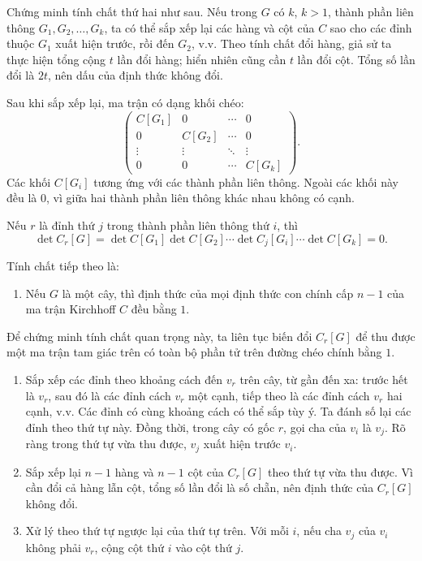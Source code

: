 \documentclass[11pt]{article}
\newcommand{\mat}[1]{\begin{pmatrix}#1\end{pmatrix}}
\begin{document}
Chứng minh tính chất thứ hai như sau. Nếu trong \(G\) có
\(k\), \(k>1\), thành phần liên thông \(G_1,G_2,\ldots,G_k\), ta có thể sắp xếp
lại các hàng và cột của \(C\) sao cho các đỉnh thuộc \(G_1\) xuất hiện trước,
rồi đến \(G_2\), v.v. Theo tính chất đổi hàng, giả sử ta thực hiện tổng cộng
\(t\) lần đổi hàng; hiển nhiên cũng cần \(t\) lần đổi cột. Tổng số lần đổi là
\(2t\), nên dấu của định thức không đổi.

Sau khi sắp xếp lại, ma trận có dạng khối chéo:
\[
  \mat{
  C[G_1]&0&\cdots&0\\
  0&C[G_2]&\cdots&0\\
  \vdots&\vdots&\ddots&\vdots\\
  0&0&\cdots&C[G_k]
  }.
\]
Các khối \(C[G_i]\) tương ứng với các thành phần liên thông. Ngoài các khối
này đều là \(0\), vì giữa hai thành phần liên thông khác nhau không có cạnh.

Nếu \(r\) là đỉnh thứ \(j\) trong thành phần liên thông thứ \(i\), thì
\[
  \det C_r[G]
  =
  \det C[G_1]\det C[G_2]\cdots
  \det C_j[G_i]\cdots
  \det C[G_k]
  =0.
\]

Tính chất tiếp theo là:

\begin{enumerate}[resume]
  \item Nếu \(G\) là một cây, thì định thức của mọi định thức con chính cấp
  \(n-1\) của ma trận Kirchhoff \(C\) đều bằng \(1\).
\end{enumerate}

Để chứng minh tính chất quan trọng này, ta liên tục biến đổi \(C_r[G]\) để thu
được một ma trận tam giác trên có toàn bộ phần tử trên đường chéo chính bằng
\(1\).

\begin{enumerate}
  \item Sắp xếp các đỉnh theo khoảng cách đến \(v_r\) trên cây, từ gần đến xa:
  trước hết là \(v_r\), sau đó là các đỉnh cách \(v_r\) một cạnh, tiếp theo là
  các đỉnh cách \(v_r\) hai cạnh, v.v. Các đỉnh có cùng khoảng cách có thể sắp
  tùy ý. Ta đánh số lại các đỉnh theo thứ tự này. Đồng thời, trong cây có gốc
  \(r\), gọi cha của \(v_i\) là \(v_j\). Rõ ràng trong thứ tự vừa thu được,
  \(v_j\) xuất hiện trước \(v_i\).

  \item Sắp xếp lại \(n-1\) hàng và \(n-1\) cột của \(C_r[G]\) theo thứ tự vừa
  thu được. Vì cần đổi cả hàng lẫn cột, tổng số lần đổi là số chẵn, nên định
  thức của \(C_r[G]\) không đổi.

  \item Xử lý theo thứ tự ngược lại của thứ tự trên. Với mỗi \(i\), nếu cha
  \(v_j\) của \(v_i\) không phải \(v_r\), cộng cột thứ \(i\) vào cột thứ
  \(j\).
\end{enumerate}
\end{document}
